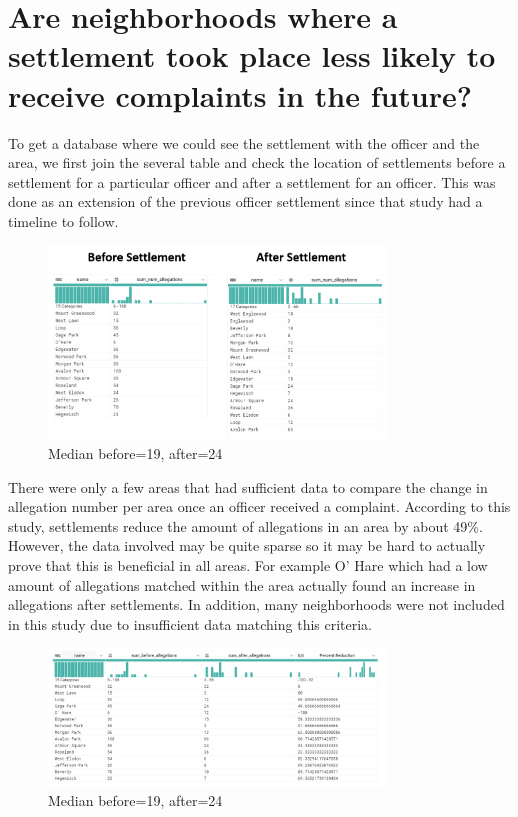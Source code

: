 \documentclass{article}
\begin{document}
\FloatBarrier


\section{Are neighborhoods where a settlement took place less likely to receive complaints in the future?}

To get a database where we could see the settlement with the officer and the area, we first join the several table and check the location of settlements before a settlement for a particular officer and after a settlement for an officer. This was done as an extension of the previous officer settlement since that study had a timeline to follow. 

\FloatBarrier

\begin{figure}[h!]
\centering
\caption{Median before=19, after=24}
\includegraphics[width=0.8\textwidth]{district_allegation_counts.png}
\end{figure}

\FloatBarrier

There were only a few areas that had sufficient data to compare the change in allegation number per area once an officer received a complaint. According to this study, settlements reduce the amount of allegations in an area by about 49\%. However, the data involved may be quite sparse so it may be hard to actually prove that this is beneficial in all areas. For example O’ Hare which had a low amount of allegations matched within the area actually found an increase in allegations after settlements. In addition, many neighborhoods were not included in this study due to insufficient data matching this criteria. 

\begin{figure}[h!]
\centering
\caption{Median before=19, after=24}
\includegraphics[width=0.8\textwidth]{district_statistics.png}
\end{figure}
\end{document}

